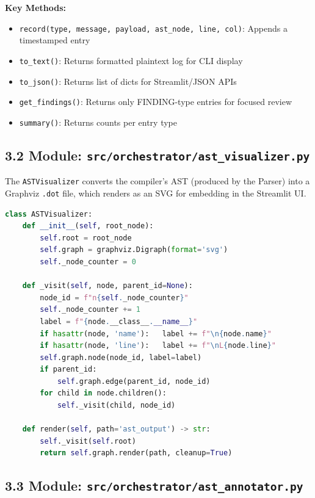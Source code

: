 \documentclass[a4paper,11pt]{article}
\begin{document}
\textbf{Key Methods:}
\begin{itemize}
    \item \texttt{record(type, message, payload, ast\_node, line, col)}: Appends a timestamped entry
    \item \texttt{to\_text()}: Returns formatted plaintext log for CLI display
    \item \texttt{to\_json()}: Returns list of dicts for Streamlit/JSON APIs
    \item \texttt{get\_findings()}: Returns only FINDING-type entries for focused review
    \item \texttt{summary()}: Returns counts per entry type
\end{itemize}

\subsection{3.2 Module: \texttt{src/orchestrator/ast\_visualizer.py}}

The \texttt{ASTVisualizer} converts the compiler's AST (produced by the Parser) into a Graphviz \texttt{.dot} file, which renders as an SVG for embedding in the Streamlit UI.

\begin{lstlisting}[language=Python, caption=ASTVisualizer core algorithm]
class ASTVisualizer:
    def __init__(self, root_node):
        self.root = root_node
        self.graph = graphviz.Digraph(format='svg')
        self._node_counter = 0

    def _visit(self, node, parent_id=None):
        node_id = f"n{self._node_counter}"
        self._node_counter += 1
        label = f"{node.__class__.__name__}"
        if hasattr(node, 'name'):   label += f"\n{node.name}"
        if hasattr(node, 'line'):   label += f"\nL{node.line}"
        self.graph.node(node_id, label=label)
        if parent_id:
            self.graph.edge(parent_id, node_id)
        for child in node.children():
            self._visit(child, node_id)

    def render(self, path='ast_output') -> str:
        self._visit(self.root)
        return self.graph.render(path, cleanup=True)
\end{lstlisting}

\subsection{3.3 Module: \texttt{src/orchestrator/ast\_annotator.py}}
\end{document}

